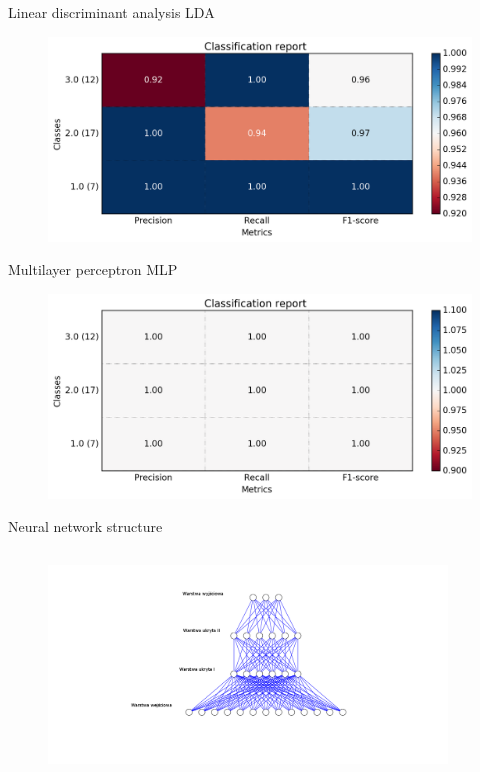 \documentclass[xcolor=x11names,compress]{beamer}
\renewcommand{\(}{\begin{columns}}
\renewcommand{\)}{\end{columns}}
\newcommand{\<}[1]{\begin{column}{#1}}
\renewcommand{\>}{\end{column}}
\begin{document}
\begin{frame}{Linear discriminant analysis LDA}
        \begin{figure}\includegraphics[width=1\textwidth]{lda.png} \end{figure}

\end{frame}

\begin{frame}{Multilayer perceptron MLP}
        \begin{figure}\includegraphics[width=1\textwidth]{mlp.png} \end{figure}

\end{frame}
\begin{frame}{Neural network structure}
	\begin{columns}
	\column{\dimexpr\paperwidth-20pt}

        \begin{figure}\includegraphics[width=400]{nn.png} \end{figure}
        \end{columns}
\end{frame}
\end{document}
